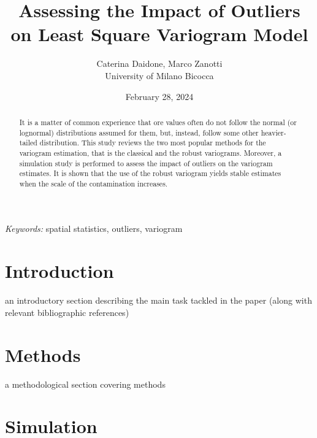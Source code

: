\documentclass[
  12pt]{article}
\begin{document}
\def\spacingset#1{\renewcommand{\baselinestretch}%
{#1}\small\normalsize} \spacingset{1}



\date{February 28, 2024}
\title{\bf Assessing the Impact of Outliers on Least Square Variogram
Model}
\author{
Caterina Daidone, Marco Zanotti\\
University of Milano Bicocca\\
}
\maketitle

\bigskip
\bigskip
\begin{abstract}
It is a matter of common experience that ore values often do not follow
the normal (or lognormal) distributions assumed for them, but, instead,
follow some other heavier-tailed distribution. This study reviews the
two most popular methods for the variogram estimation, that is the
classical and the robust variograms. Moreover, a simulation study is
performed to assess the impact of outliers on the variogram estimates.
It is shown that the use of the robust variogram yields stable estimates
when the scale of the contamination increases.
\end{abstract}

\noindent%
{\it Keywords:} spatial statistics, outliers, variogram
\vfill

\newpage
\spacingset{1.9} %

\section{Introduction}\label{introduction}

an introductory section describing the main task tackled in the paper
(along with relevant bibliographic references)

\section{Methods}\label{methods}

a methodological section covering methods

\section{Simulation}\label{simulation}
\end{document}
